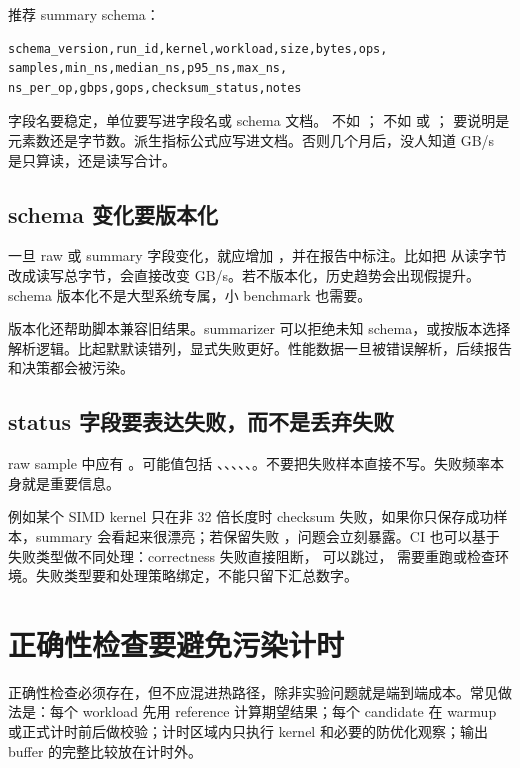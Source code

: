 推荐 summary schema：

\begin{lstlisting}
schema_version,run_id,kernel,workload,size,bytes,ops,
samples,min_ns,median_ns,p95_ns,max_ns,
ns_per_op,gbps,gops,checksum_status,notes
\end{lstlisting}

字段名要稳定，单位要写进字段名或 schema 文档。  不如 ； 不如  或 ； 要说明是元素数还是字节数。派生指标公式应写进文档。否则几个月后，没人知道 GB/s 是只算读，还是读写合计。

\subsection{schema 变化要版本化}

一旦 raw 或 summary 字段变化，就应增加 ，并在报告中标注。比如把  从读字节改成读写总字节，会直接改变 GB/s。若不版本化，历史趋势会出现假提升。schema 版本化不是大型系统专属，小 benchmark 也需要。

版本化还帮助脚本兼容旧结果。summarizer 可以拒绝未知 schema，或按版本选择解析逻辑。比起默默读错列，显式失败更好。性能数据一旦被错误解析，后续报告和决策都会被污染。

\subsection{status 字段要表达失败，而不是丢弃失败}

raw sample 中应有 。可能值包括 、、、、、。不要把失败样本直接不写。失败频率本身就是重要信息。

例如某个 SIMD kernel 只在非 32 倍长度时 checksum 失败，如果你只保存成功样本，summary 会看起来很漂亮；若保留失败 ，问题会立刻暴露。CI 也可以基于失败类型做不同处理：correctness 失败直接阻断， 可以跳过， 需要重跑或检查环境。失败类型要和处理策略绑定，不能只留下汇总数字。

\section{正确性检查要避免污染计时}

正确性检查必须存在，但不应混进热路径，除非实验问题就是端到端成本。常见做法是：每个 workload 先用 reference 计算期望结果；每个 candidate 在 warmup 或正式计时前后做校验；计时区域内只执行 kernel 和必要的防优化观察；输出 buffer 的完整比较放在计时外。

